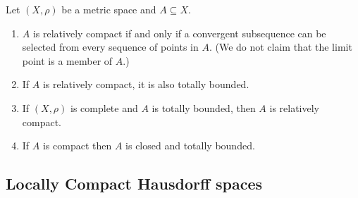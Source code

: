 \documentclass{article}
\theoremstyle{definition}
\numberwithin{equation}{section}
\begin{document}
		\begin{thm} \label{thm:compactness-properties} Let $(X,\rho)$ be a metric space and $A\subseteq X$.
			\begin{enumerate}
				\item $A$ is relatively compact if and only if a convergent subsequence can be selected from every sequence of points in $A$. (We do not claim that the limit point is a member of $A$.)
				\item If $A$ is relatively compact, it is also totally bounded.
				\item If $(X,\rho)$ is complete and $A$ is totally bounded, then $A$ is relatively compact.
				\item If $A$ is compact then $A$ is closed and totally bounded.
			\end{enumerate}
		\end{thm}
		
	\subsection{Locally Compact Hausdorff spaces}
		
\end{document}
